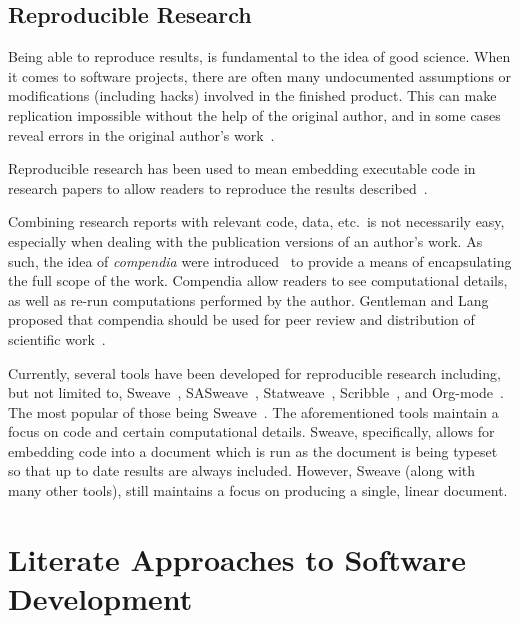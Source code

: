 \subsection{Reproducible Research}

Being able to reproduce results, is fundamental to the idea of good science.
When it comes to software projects, there are often many undocumented
assumptions or modifications (including hacks) involved in the finished product.
This can make replication impossible without the help of the original author,
and in some cases reveal errors in the original author's
work~\cite{IonescuAndJansson2013}.

Reproducible research has been used to mean embedding executable code in
research papers to allow readers to reproduce the results
described~\cite{SchulteEtAl2012}.

Combining research reports with relevant code, data, etc.\ is not necessarily
easy, especially when dealing with the publication versions of an author's work.
As such, the idea of \emph{compendia} were
introduced~\cite{GentlemanAndLang2012} to provide a means of encapsulating the
full scope of the work. Compendia allow readers to see computational details, as
well as re-run computations performed by the author. Gentleman and Lang proposed
that compendia should be used for peer review and distribution of scientific
work~\cite{GentlemanAndLang2012}.

Currently, several tools have been developed for reproducible research
including, but not limited to, Sweave~\cite{Leisch2002},
SASweave~\cite{LenthEtAl2007}, Statweave~\cite{Lenth2009},
Scribble~\cite{FlattEtAl2009}, and Org-mode~\cite{SchulteEtAl2012}. The most
popular of those being Sweave~\cite{SchulteEtAl2012}. The aforementioned tools
maintain a focus on code and certain computational details. Sweave,
specifically, allows for embedding code into a document which is run as the
document is being typeset so that up to date results are always included.
However, Sweave (along with many other tools), still maintains a focus on
producing a single, linear document. 

\section{Literate Approaches to Software Development}

